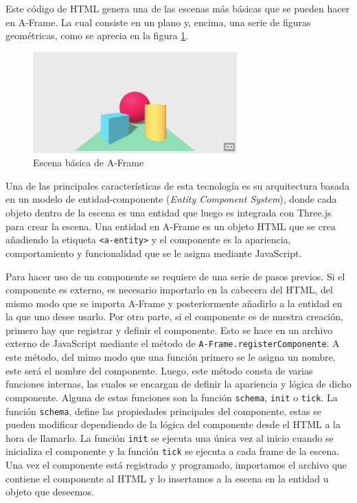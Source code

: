 \documentclass[a4paper, 12pt]{book}
\begin{document}
Este código de HTML genera una de las escenas más básicas que se pueden hacer en A-Frame. La cual consiste en un plano y, encima, una serie de figuras geométricas, como se aprecia en la figura \ref{fig:aframe-basic}.

\begin{figure}[H]  
  \centering
  \includegraphics[width=0.7\textwidth]{img/aframe_hello_world.png}
  \caption{Escena básica de A-Frame}
  \label{fig:aframe-basic}
\end{figure}

Una de las principales características de esta tecnología es su arquitectura basada en un modelo de entidad-componente (\textit{Entity Component System}), donde cada objeto dentro de la escena es una entidad que luego es integrada con Three.js para crear la escena.
Una entidad en A-Frame es un objeto HTML que se crea añadiendo la etiqueta \texttt{<a-entity>} y el componente es la apariencia, comportamiento y funcionalidad que se le asigna mediante JavaScript. 

Para hacer uso de un componente se requiere de una serie de pasos previos. Si el componente es externo, es necesario importarlo en la cabecera del HTML, del mismo modo que se importa A-Frame y posteriormente añadirlo a la entidad en la que uno desee usarlo.
Por otra parte, si el componente es de nuestra creación, primero hay que registrar y definir el componente. Esto se hace en un archivo externo de JavaScript mediante el método de \texttt{A-Frame.registerComponente}. A este método, del mimo modo que una función primero se le asigna un nombre, 
este será el nombre del componente. Luego, este método consta de varias funciones internas, las cuales se encargan de definir la apariencia y lógica de dicho componente. Alguna de estas funciones son la función \texttt{schema}, \texttt{init} o \texttt{tick}.
La función \texttt{schema}, define las propiedades principales del componente, estas se pueden modificar dependiendo de la lógica del componente desde el HTML a la hora de llamarlo. La función \texttt{init} se ejecuta una única vez al inicio cuando se inicializa el componente y la función \texttt{tick} se ejecuta a cada frame de la escena.
Una vez el componente está registrado y programado, importamos el archivo que contiene el componente al HTML y lo insertamos a la escena en la entidad u objeto que deseemos. 
\end{document}
